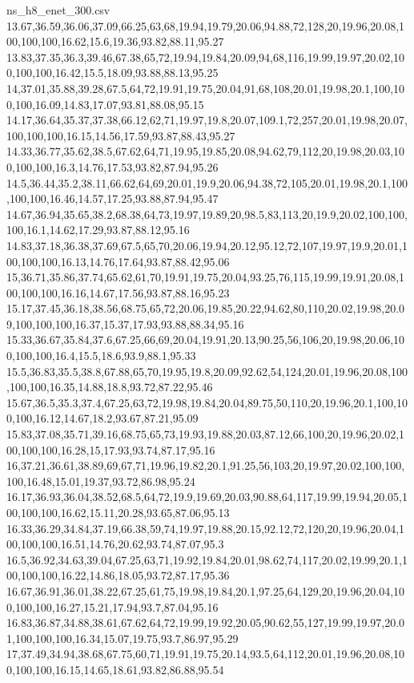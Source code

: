 \begin{filecontents*}[overwrite]{ns_h8_enet_300.csv}
13.67,36.59,36.06,37.09,66.25,63,68,19.94,19.79,20.06,94.88,72,128,20,19.96,20.08,100,100,100,16.62,15.6,19.36,93.82,88.11,95.27
13.83,37.35,36.3,39.46,67.38,65,72,19.94,19.84,20.09,94,68,116,19.99,19.97,20.02,100,100,100,16.42,15.5,18.09,93.88,88.13,95.25
14,37.01,35.88,39.28,67.5,64,72,19.91,19.75,20.04,91,68,108,20.01,19.98,20.1,100,100,100,16.09,14.83,17.07,93.81,88.08,95.15
14.17,36.64,35.37,37.38,66.12,62,71,19.97,19.8,20.07,109.1,72,257,20.01,19.98,20.07,100,100,100,16.15,14.56,17.59,93.87,88.43,95.27
14.33,36.77,35.62,38.5,67.62,64,71,19.95,19.85,20.08,94.62,79,112,20,19.98,20.03,100,100,100,16.3,14.76,17.53,93.82,87.94,95.26
14.5,36.44,35.2,38.11,66.62,64,69,20.01,19.9,20.06,94.38,72,105,20.01,19.98,20.1,100,100,100,16.46,14.57,17.25,93.88,87.94,95.47
14.67,36.94,35.65,38.2,68.38,64,73,19.97,19.89,20,98.5,83,113,20,19.9,20.02,100,100,100,16.1,14.62,17.29,93.87,88.12,95.16
14.83,37.18,36.38,37.69,67.5,65,70,20.06,19.94,20.12,95.12,72,107,19.97,19.9,20.01,100,100,100,16.13,14.76,17.64,93.87,88.42,95.06
15,36.71,35.86,37.74,65.62,61,70,19.91,19.75,20.04,93.25,76,115,19.99,19.91,20.08,100,100,100,16.16,14.67,17.56,93.87,88.16,95.23
15.17,37.45,36.18,38.56,68.75,65,72,20.06,19.85,20.22,94.62,80,110,20.02,19.98,20.09,100,100,100,16.37,15.37,17.93,93.88,88.34,95.16
15.33,36.67,35.84,37.6,67.25,66,69,20.04,19.91,20.13,90.25,56,106,20,19.98,20.06,100,100,100,16.4,15.5,18.6,93.9,88.1,95.33
15.5,36.83,35.5,38.8,67.88,65,70,19.95,19.8,20.09,92.62,54,124,20.01,19.96,20.08,100,100,100,16.35,14.88,18.8,93.72,87.22,95.46
15.67,36.5,35.3,37.4,67.25,63,72,19.98,19.84,20.04,89.75,50,110,20,19.96,20.1,100,100,100,16.12,14.67,18.2,93.67,87.21,95.09
15.83,37.08,35.71,39.16,68.75,65,73,19.93,19.88,20.03,87.12,66,100,20,19.96,20.02,100,100,100,16.28,15,17.93,93.74,87.17,95.16
16,37.21,36.61,38.89,69,67,71,19.96,19.82,20.1,91.25,56,103,20,19.97,20.02,100,100,100,16.48,15.01,19.37,93.72,86.98,95.24
16.17,36.93,36.04,38.52,68.5,64,72,19.9,19.69,20.03,90.88,64,117,19.99,19.94,20.05,100,100,100,16.62,15.11,20.28,93.65,87.06,95.13
16.33,36.29,34.84,37.19,66.38,59,74,19.97,19.88,20.15,92.12,72,120,20,19.96,20.04,100,100,100,16.51,14.76,20.62,93.74,87.07,95.3
16.5,36.92,34.63,39.04,67.25,63,71,19.92,19.84,20.01,98.62,74,117,20.02,19.99,20.1,100,100,100,16.22,14.86,18.05,93.72,87.17,95.36
16.67,36.91,36.01,38.22,67.25,61,75,19.98,19.84,20.1,97.25,64,129,20,19.96,20.04,100,100,100,16.27,15.21,17.94,93.7,87.04,95.16
16.83,36.87,34.88,38.61,67.62,64,72,19.99,19.92,20.05,90.62,55,127,19.99,19.97,20.01,100,100,100,16.34,15.07,19.75,93.7,86.97,95.29
17,37.49,34.94,38.68,67.75,60,71,19.91,19.75,20.14,93.5,64,112,20.01,19.96,20.08,100,100,100,16.15,14.65,18.61,93.82,86.88,95.54

\end{filecontents*}
